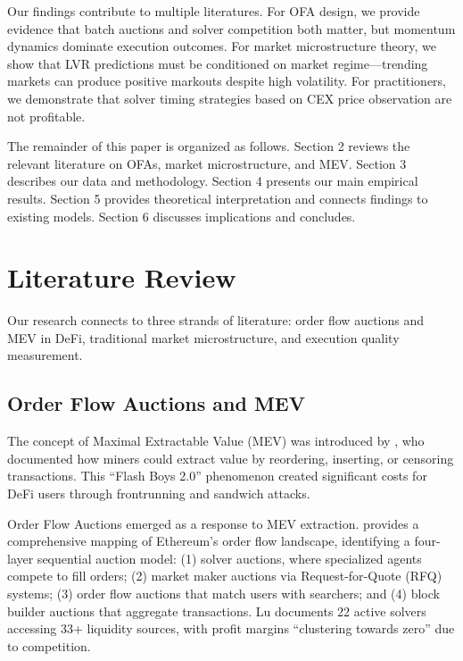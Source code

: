\documentclass[12pt,a4paper]{article}
\begin{document}
Our findings contribute to multiple literatures. For OFA design, we provide evidence that batch auctions and solver competition both matter, but momentum dynamics dominate execution outcomes. For market microstructure theory, we show that LVR predictions must be conditioned on market regime---trending markets can produce positive markouts despite high volatility. For practitioners, we demonstrate that solver timing strategies based on CEX price observation are not profitable.

The remainder of this paper is organized as follows. Section 2 reviews the relevant literature on OFAs, market microstructure, and MEV. Section 3 describes our data and methodology. Section 4 presents our main empirical results. Section 5 provides theoretical interpretation and connects findings to existing models. Section 6 discusses implications and concludes.

\section{Literature Review}

Our research connects to three strands of literature: order flow auctions and MEV in DeFi, traditional market microstructure, and execution quality measurement.

\subsection{Order Flow Auctions and MEV}

The concept of Maximal Extractable Value (MEV) was introduced by \cite{daian2020}, who documented how miners could extract value by reordering, inserting, or censoring transactions. This ``Flash Boys 2.0'' phenomenon created significant costs for DeFi users through frontrunning and sandwich attacks.

Order Flow Auctions emerged as a response to MEV extraction. \cite{lu2024} provides a comprehensive mapping of Ethereum's order flow landscape, identifying a four-layer sequential auction model: (1) solver auctions, where specialized agents compete to fill orders; (2) market maker auctions via Request-for-Quote (RFQ) systems; (3) order flow auctions that match users with searchers; and (4) block builder auctions that aggregate transactions. Lu documents 22 active solvers accessing 33+ liquidity sources, with profit margins ``clustering towards zero'' due to competition.
\end{document}
